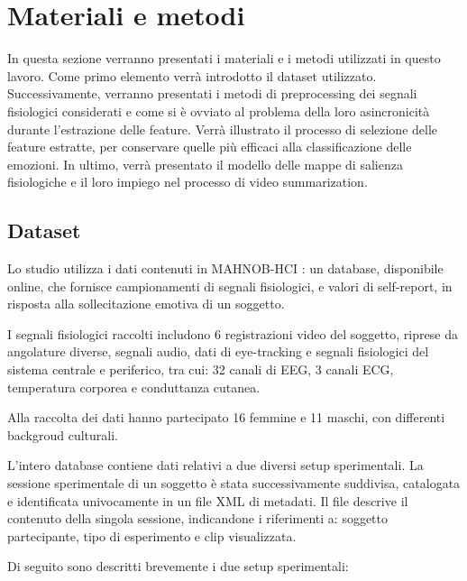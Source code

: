 \section{Materiali e metodi}

In questa sezione verranno presentati i materiali e i metodi utilizzati in questo lavoro. Come primo elemento verrà introdotto il dataset utilizzato. Successivamente, verranno presentati i metodi di preprocessing dei segnali fisiologici considerati e come si è ovviato al problema della loro asincronicità durante l'estrazione delle feature.
Verrà illustrato il processo di selezione delle feature estratte, per conservare quelle più efficaci alla classificazione delle emozioni.
In ultimo, verrà presentato il modello delle mappe di salienza fisiologiche e il loro impiego nel processo di video summarization.

\subsection{Dataset}

Lo studio utilizza i dati contenuti in MAHNOB-HCI \cite{soleymani2011multimodal}: un database, disponibile online, che fornisce campionamenti di segnali fisiologici, e valori di self-report, in risposta alla sollecitazione emotiva di un soggetto.

I segnali fisiologici raccolti includono 6 registrazioni video del soggetto, riprese da angolature diverse, segnali audio, dati di eye-tracking e segnali fisiologici del sistema centrale e periferico, tra cui: 32 canali di EEG, 3 canali ECG, temperatura corporea e conduttanza cutanea.

Alla raccolta dei dati hanno partecipato 16 femmine e 11 maschi, con differenti backgroud culturali.

L'intero database contiene dati relativi a due diversi setup sperimentali. La sessione sperimentale di un soggetto è stata successivamente suddivisa, catalogata e identificata univocamente in un file XML di metadati. Il file descrive il contenuto della singola sessione, indicandone i riferimenti a: soggetto partecipante, tipo di esperimento e clip visualizzata.

Di seguito sono descritti brevemente i due setup sperimentali:

